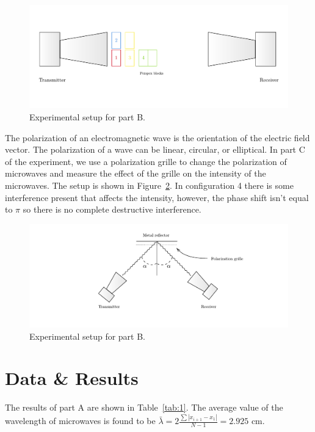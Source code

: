 \documentclass[10pt]{article}
\begin{document}
\begin{figure}[ht]
  \centering
  \includegraphics[scale=0.4]{figures/f2.pdf}
  \caption{Experimental setup for part B.}
  \label{fig:2}
\end{figure}

The polarization of an electromagnetic wave is the orientation of the electric field vector. The polarization of a wave can be linear, circular, or elliptical. In part C of the experiment, we use a polarization grille to change the polarization of microwaves and measure the effect of the grille on the intensity of the microwaves. The setup is shown in Figure~\ref{fig:3}. In configuration 4 there is some interference present that affects the intensity, however, the phase shift isn't equal to $\pi$ so there is no complete destructive interference.

\begin{figure}[ht]
  \centering
  \includegraphics[scale=0.6]{figures/f3.pdf}
  \caption{Experimental setup for part B.}
  \label{fig:3}
\end{figure}

\section{Data \& Results}

The results of part A are shown in Table~\ref{tab:1}. The average value of the wavelength of microwaves is found to be $\bar{\lambda} = 2 \frac{\sum\left|x_{i+1}-x_1\right|}{N-1} = 2.925$ cm. 
\end{document}
